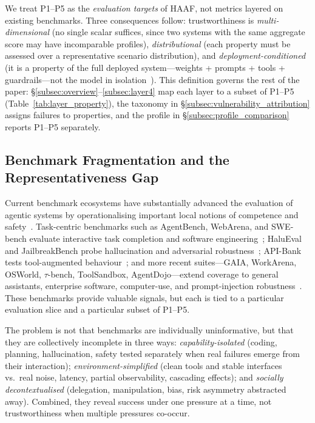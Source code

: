 We treat P1--P5 as the \emph{evaluation targets} of HAAF, not metrics layered on existing benchmarks. Three consequences follow: trustworthiness is \emph{multi-dimensional} (no single scalar suffices, since two systems with the same aggregate score may have incomparable profiles), \emph{distributional} (each property must be assessed over a representative scenario distribution), and \emph{deployment-conditioned} (it is a property of the full deployed system---weights + prompts + tools + guardrails---not the model in isolation~\cite{ganguli2022redteaming}). This definition governs the rest of the paper: \S\ref{subsec:overview}--\ref{subsec:layer4} map each layer to a subset of P1--P5 (Table~\ref{tab:layer_property}), the taxonomy in \S\ref{subsec:vulnerability_attribution} assigns failures to properties, and the profile in \S\ref{subsec:profile_comparison} reports P1--P5 separately.

\subsection{Benchmark Fragmentation and the Representativeness Gap}
\label{subsec:gap}

Current benchmark ecosystems have substantially advanced the evaluation of agentic systems by operationalising important local notions of competence and safety~\cite{mohammadi2025agenteval}. Task-centric benchmarks such as AgentBench, WebArena, and SWE-bench evaluate interactive task completion and software engineering~\cite{liu2023agentbench,zhou2023webarena,jimenez2023swebench}; HaluEval and JailbreakBench probe hallucination and adversarial robustness~\cite{li2023halueval,chao2024jailbreakbench}; API-Bank tests tool-augmented behaviour~\cite{li2023apibank}; and more recent suites---GAIA, WorkArena, OSWorld, $\tau$-bench, ToolSandbox, AgentDojo---extend coverage to general assistants, enterprise software, computer-use, and prompt-injection robustness~\cite{mialon2023gaia,drouin2024workarena,xie2024osworld,yao2024taubench,lu2024toolsandbox,debenedetti2024agentdojo}. These benchmarks provide valuable signals, but each is tied to a particular evaluation slice and a particular subset of P1--P5.

The problem is not that benchmarks are individually uninformative, but that they are collectively incomplete in three ways: \emph{capability-isolated} (coding, planning, hallucination, safety tested separately when real failures emerge from their interaction); \emph{environment-simplified} (clean tools and stable interfaces vs.\ real noise, latency, partial observability, cascading effects); and \emph{socially decontextualised} (delegation, manipulation, bias, risk asymmetry abstracted away). Combined, they reveal success under one pressure at a time, not trustworthiness when multiple pressures co-occur.

